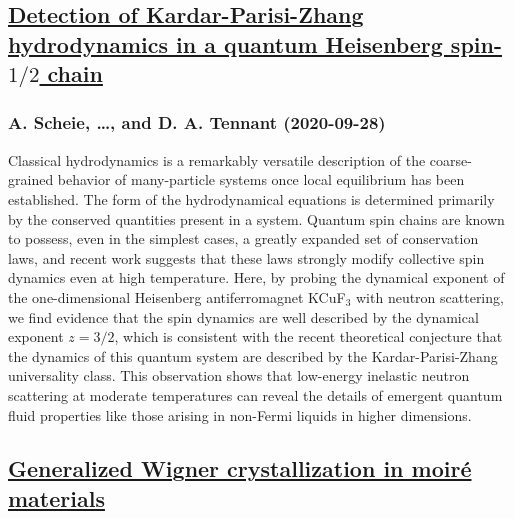 \subsection*{\href{http://arxiv.org/abs/2009.13535v1}{Detection of Kardar-Parisi-Zhang hydrodynamics in a quantum Heisenberg  spin-$1/2$ chain}}
\subsubsection*{A. Scheie, \dots, and D. A. Tennant (2020-09-28)}
Classical hydrodynamics is a remarkably versatile description of the
coarse-grained behavior of many-particle systems once local equilibrium has
been established. The form of the hydrodynamical equations is determined
primarily by the conserved quantities present in a system. Quantum spin chains
are known to possess, even in the simplest cases, a greatly expanded set of
conservation laws, and recent work suggests that these laws strongly modify
collective spin dynamics even at high temperature. Here, by probing the
dynamical exponent of the one-dimensional Heisenberg antiferromagnet KCuF$_3$
with neutron scattering, we find evidence that the spin dynamics are well
described by the dynamical exponent $z=3/2$, which is consistent with the
recent theoretical conjecture that the dynamics of this quantum system are
described by the Kardar-Parisi-Zhang universality class. This observation shows
that low-energy inelastic neutron scattering at moderate temperatures can
reveal the details of emergent quantum fluid properties like those arising in
non-Fermi liquids in higher dimensions.

\subsection*{\href{http://arxiv.org/abs/2009.13536v1}{Generalized Wigner crystallization in moiré materials}}
